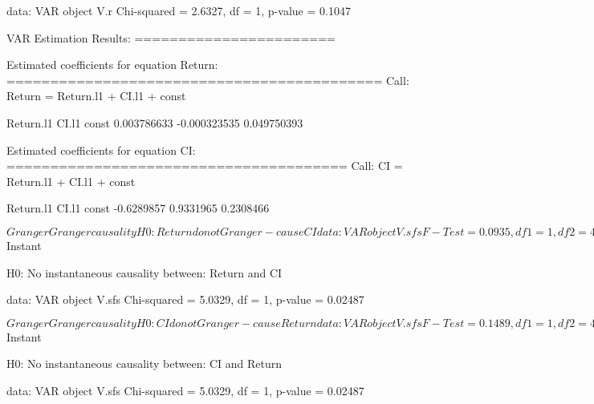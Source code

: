 \documentclass{article}
\begin{document}
\begin{Schunk}
\begin{Soutput}
data:  VAR object V.r
Chi-squared = 2.6327, df = 1, p-value = 0.1047
\end{Soutput}
\begin{Soutput}
VAR Estimation Results:
======================= 

Estimated coefficients for equation Return: 
=========================================== 
Call:
Return = Return.l1 + CI.l1 + const 

   Return.l1        CI.l1        const 
 0.003786633 -0.000323535  0.049750393 


Estimated coefficients for equation CI: 
======================================= 
Call:
CI = Return.l1 + CI.l1 + const 

 Return.l1      CI.l1      const 
-0.6289857  0.9331965  0.2308466 
\end{Soutput}
\begin{Soutput}
$Granger

	Granger causality H0: Return do not Granger-cause CI

data:  VAR object V.sfs
F-Test = 0.0935, df1 = 1, df2 = 420, p-value = 0.7599


$Instant

	H0: No instantaneous causality between: Return and CI

data:  VAR object V.sfs
Chi-squared = 5.0329, df = 1, p-value = 0.02487
\end{Soutput}
\begin{Soutput}
$Granger

	Granger causality H0: CI do not Granger-cause Return

data:  VAR object V.sfs
F-Test = 0.1489, df1 = 1, df2 = 420, p-value = 0.6998


$Instant

	H0: No instantaneous causality between: CI and Return

data:  VAR object V.sfs
Chi-squared = 5.0329, df = 1, p-value = 0.02487
\end{Soutput}
\end{Schunk}
\end{document}
